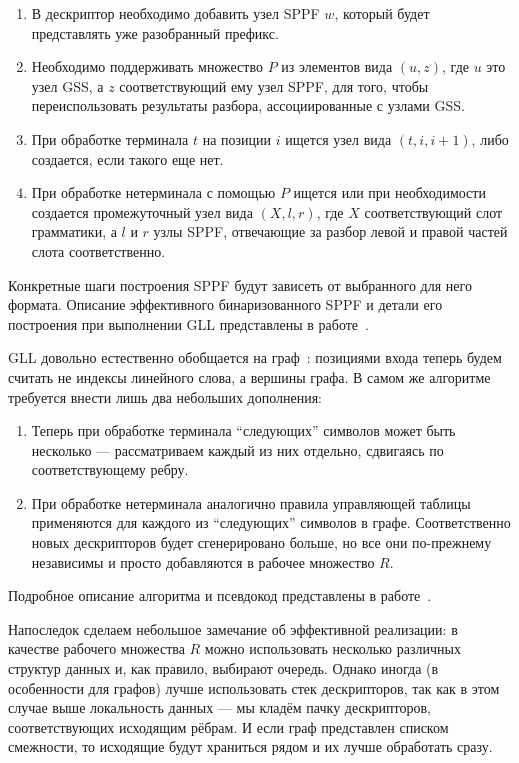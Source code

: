 \begin{enumerate}
  \item В дескриптор необходимо добавить узел SPPF $ w $, который будет представлять уже разобранный префикс. 
  \item Необходимо поддерживать множество $ P $ из элементов вида $ (u, z) $, где $ u $ это узел GSS, а $ z $ соответствующий ему узел SPPF, для того, чтобы переиспользовать результаты разбора, ассоциированные с узлами GSS. 
  \item При обработке терминала $ t $ на позиции $ i $ ищется узел вида $ (t, i, i + 1) $, либо создается, если такого еще нет.
  \item При обработке нетерминала с помощью $ P $ ищется или при необходимости создается промежуточный узел вида $ (X, l, r) $, где $ X $ соответствующий слот грамматики, а $ l $ и $ r $ узлы SPPF, отвечающие за разбор левой и правой частей слота соответственно.
\end{enumerate}

Конкретные шаги построения SPPF будут зависеть от выбранного для него формата. Описание эффективного бинаризованного SPPF и детали его построения при выполнении GLL представлены в работе~\cite{10.1007/978-3-662-46663-6_5}.

GLL довольно естественно обобщается на граф~\cite{Grigorev:2017:CPQ:3166094.3166104}: позициями входа теперь будем считать не индексы линейного слова, а вершины графа. В самом же алгоритме требуется внести лишь два небольших дополнения:

\begin{enumerate}
  \item Теперь при обработке терминала ``следующих'' символов может быть несколько --- рассматриваем каждый из них отдельно, сдвигаясь по соответствующему ребру.
  \item При обработке нетерминала аналогично правила управляющей таблицы применяются  для каждого из ``следующих'' символов в графе. Соответственно новых дескрипторов будет сгенерировано больше, но все они по-прежнему независимы и просто добавляются в рабочее множество $ R $.  
\end{enumerate}

Подробное описание алгоритма и псевдокод представлены в работе~\cite{Grigorev:2017:CPQ:3166094.3166104}. 

Напоследок сделаем небольшое замечание об эффективной реализации: в качестве рабочего множества $ R $ можно использовать несколько различных структур данных и, как правило, выбирают очередь. Однако иногда (в особенности для графов) лучше использовать стек дескрипторов, так как в этом случае выше локальность данных --- мы кладём пачку дескрипторов, соответствующих исходящим рёбрам. И если граф представлен списком смежности, то исходящие будут храниться рядом и их лучше обработать сразу.

